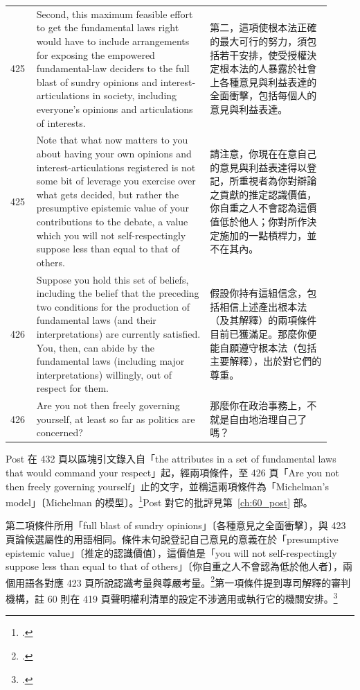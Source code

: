 \begin{longtable}{@{}L{0.07\linewidth}L{0.50\linewidth}L{0.35\linewidth}@{}}
425 & Second, this maximum feasible effort to get the fundamental laws right would have to include arrangements for exposing the empowered fundamental-law deciders to the full blast of sundry opinions and interest-articulations in society, including everyone's opinions and articulations of interests. & 第二，這項使根本法正確的最大可行的努力，須包括若干安排，使受授權決定根本法的人暴露於社會上各種意見與利益表達的全面衝擊，包括每個人的意見與利益表達。 \\
425 & Note that what now matters to you about having your own opinions and interest-articulations registered is not some bit of leverage you exercise over what gets decided, but rather the presumptive epistemic value of your contributions to the debate, a value which you will not self-respectingly suppose less than equal to that of others. & 請注意，你現在在意自己的意見與利益表達得以登記，所重視者為你對辯論之貢獻的推定認識價值，你自重之人不會認為這價值低於他人；你對所作決定施加的一點槓桿力，並不在其內。 \\
426 & Suppose you hold this set of beliefs, including the belief that the preceding two conditions for the production of fundamental laws (and their interpretations) are currently satisfied. You, then, can abide by the fundamental laws (including major interpretations) willingly, out of respect for them. & 假設你持有這組信念，包括相信上述產出根本法（及其解釋）的兩項條件目前已獲滿足。那麼你便能自願遵守根本法（包括主要解釋），出於對它們的尊重。 \\
426 & Are you not then freely governing yourself, at least so far as politics are concerned? & 那麼你在政治事務上，不就是自由地治理自己了嗎？ \\
\bottomrule
\end{longtable}

Post 在 432 頁以區塊引文錄入自「the attributes in a set of fundamental laws that would command your respect」起，經兩項條件，至 426 頁「Are you not then freely governing yourself」止的文字，並稱這兩項條件為「Michelman's model」〔Michelman 的模型〕。\footcite[432 \& nn.12--14]{post1998}Post 對它的批評見第~\ref{ch:60_post} 部。

第二項條件所用「full blast of sundry opinions」〔各種意見之全面衝擊〕，與 423 頁論候選屬性的用語相同。條件末句說登記自己意見的意義在於「presumptive epistemic value」〔推定的認識價值〕，這價值是「you will not self-respectingly suppose less than equal to that of others」〔你自重之人不會認為低於他人者〕，兩個用語各對應 423 頁所說認識考量與尊嚴考量。\footcite[423, 425]{michelman1998}第一項條件提到專司解釋的審判機構，註 60 則在 419 頁聲明權利清單的設定不涉適用或執行它的機關安排。\footcite[419 n.60, 425]{michelman1998}

